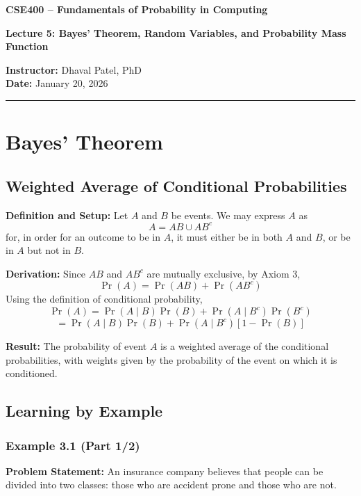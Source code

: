 \documentclass[12pt]{article}
\begin{document}
\begin{center}
\textbf{CSE400 – Fundamentals of Probability in Computing}

\vspace{0.5em}

\textbf{Lecture 5: Bayes’ Theorem, Random Variables, and Probability Mass Function}

\vspace{0.5em}

\textbf{Instructor:} Dhaval Patel, PhD \\
\textbf{Date:} January 20, 2026
\end{center}

\hrule
\vspace{1em}

\section{Bayes’ Theorem}

\subsection{Weighted Average of Conditional Probabilities}

\textbf{Definition and Setup:}  
Let $A$ and $B$ be events. We may express $A$ as
\[
A = AB \cup AB^c
\]
for, in order for an outcome to be in $A$, it must either be in both $A$ and $B$, or be in $A$ but not in $B$.

\textbf{Derivation:}  
Since $AB$ and $AB^c$ are mutually exclusive, by Axiom 3,
\[
\Pr(A) = \Pr(AB) + \Pr(AB^c)
\]
Using the definition of conditional probability,
\[
\Pr(A) = \Pr(A \mid B)\Pr(B) + \Pr(A \mid B^c)\Pr(B^c)
\]
\[
= \Pr(A \mid B)\Pr(B) + \Pr(A \mid B^c)[1 - \Pr(B)]
\]

\textbf{Result:}  
The probability of event $A$ is a weighted average of the conditional probabilities, with weights given by the probability of the event on which it is conditioned.

\subsection{Learning by Example}

\subsubsection{Example 3.1 (Part 1/2)}

\textbf{Problem Statement:}  
An insurance company believes that people can be divided into two classes: those who are accident prone and those who are not.
\end{document}
